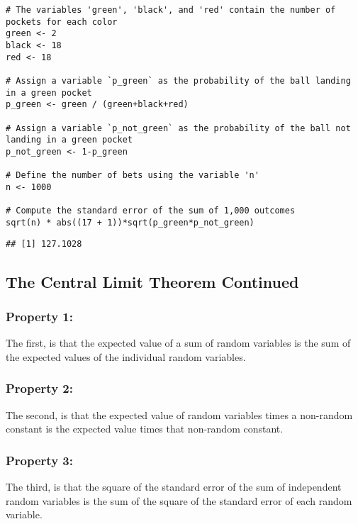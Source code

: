 \documentclass[
]{article}
\begin{document}
\begin{verbatim}
# The variables 'green', 'black', and 'red' contain the number of pockets for each color
green <- 2
black <- 18
red <- 18

# Assign a variable `p_green` as the probability of the ball landing in a green pocket
p_green <- green / (green+black+red)

# Assign a variable `p_not_green` as the probability of the ball not landing in a green pocket
p_not_green <- 1-p_green

# Define the number of bets using the variable 'n'
n <- 1000

# Compute the standard error of the sum of 1,000 outcomes
sqrt(n) * abs((17 + 1))*sqrt(p_green*p_not_green)
\end{verbatim}

\begin{verbatim}
## [1] 127.1028
\end{verbatim}

\hypertarget{the-central-limit-theorem-continued}{%
\subsection{The Central Limit Theorem
Continued}\label{the-central-limit-theorem-continued}}

\hypertarget{property-1}{%
\subsubsection{Property 1:}\label{property-1}}

The first, is that the expected value of a sum of random variables is
the sum of the expected values of the individual random variables.

\hypertarget{property-2}{%
\subsubsection{Property 2:}\label{property-2}}

The second, is that the expected value of random variables times a
non-random constant is the expected value times that non-random
constant.

\hypertarget{property-3}{%
\subsubsection{Property 3:}\label{property-3}}

The third, is that the square of the standard error of the sum of
independent random variables is the sum of the square of the standard
error of each random variable.
\end{document}
